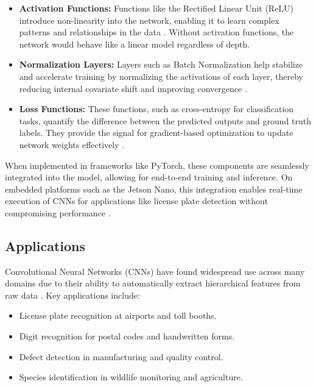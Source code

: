 \begin{itemize}
	\item \textbf{Activation Functions:} Functions like the Rectified Linear Unit (ReLU) introduce non-linearity into the network, enabling it to learn complex patterns and relationships in the data \cite{goodfellow2016deep, pytorchdocs}. Without activation functions, the network would behave like a linear model regardless of depth.
	
	\item \textbf{Normalization Layers:} Layers such as Batch Normalization help stabilize and accelerate training by normalizing the activations of each layer, thereby reducing internal covariate shift and improving convergence \cite{ioffe2015batch, pytorchdocs}.
	
	\item \textbf{Loss Functions:} These functions, such as cross-entropy for classification tasks, quantify the difference between the predicted outputs and ground truth labels. They provide the signal for gradient-based optimization to update network weights effectively \cite{pinto2022springer, pytorchdocs}.
\end{itemize}

When implemented in frameworks like PyTorch, these components are seamlessly integrated into the model, allowing for end-to-end training and inference. On embedded platforms such as the Jetson Nano, this integration enables real-time execution of CNNs for applications like license plate detection without compromising performance \cite{pytorchdocs, jetsonpytorch}.

 \subsection{Applications}
 Convolutional Neural Networks (CNNs) have found widespread use across many domains due to their ability to automatically extract hierarchical features from raw data \cite{goodfellow2016deep, pinto2022springer}. Key applications include:
 
 \begin{itemize}
 	\item License plate recognition at airports and toll booths.
 	\item Digit recognition for postal codes and handwritten forms.
 	\item Defect detection in manufacturing and quality control.
 	\item Species identification in wildlife monitoring and agriculture.
 \end{itemize}
 
